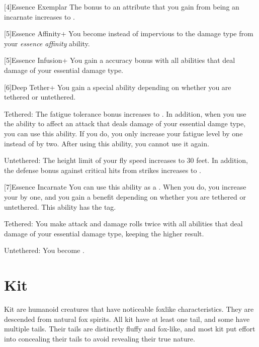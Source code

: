     [4]{Essence Exemplar} The bonus to an attribute that you gain from being an incarnate increases to .

    [5]{Essence Affinity+} You become  instead of impervious to the damage type from your \textit{essence affinity} ability.

    [5]{Essence Infusion+} You gain a  accuracy bonus with all abilities that deal damage of your essential damage type.

    [6]{Deep Tether+} You gain a special ability depending on whether you are tethered or untethered.
    \begin{raggeditemize}
        \item Tethered: The fatigue tolerance bonus increases to .
            In addition, when you use the  ability to affect an attack that deals damage of your essential damge type, you can use this ability.
            If you do, you only increase your fatigue level by one instead of by two.
            After using this ability, you  cannot use it again.
        \item Untethered: The height limit of your fly speed increases to 30 feet.
            In addition, the defense bonus against critical hits from strikes increases to .
    \end{raggeditemize}

    [7]{Essence Incarnate} You can use this ability as a .
    When you do, you increase your  by one, and you gain a benefit depending on whether you are tethered or untethered.
    This ability has the  tag.
    \begin{raggeditemize}
        \item Tethered: You  make attack and damage rolls twice with all abilities that deal damage of your essential damage type, keeping the higher result.
        \item Untethered: You  become .
    \end{raggeditemize}

\section{Kit}

    Kit are humanoid creatures that have noticeable foxlike characteristics.
    They are descended from natural fox spirits.
    All kit have at least one tail, and some have multiple tails.
    Their tails are distinctly fluffy and fox-like, and most kit put effort into concealing their tails to avoid revealing their true nature.

